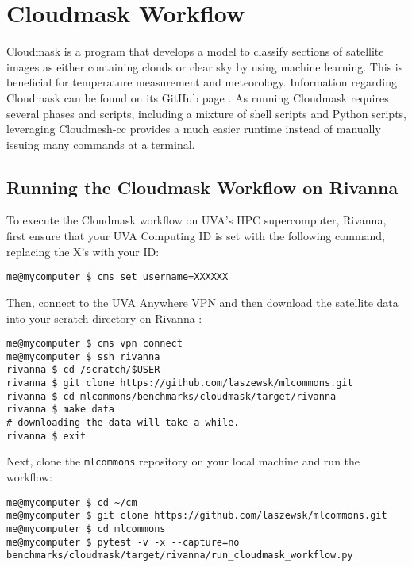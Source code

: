 
\section{Cloudmask Workflow}\label{cloudmask-workflow}

Cloudmask is a program that develops a model to classify sections
of satellite images as either containing clouds or clear sky by
using machine learning. This is beneficial for temperature measurement and
meteorology.
Information regarding Cloudmask can be found on its GitHub page \cite{www-cloudmask}.
As running Cloudmask requires several phases and scripts, including a
mixture of shell scripts and Python scripts, leveraging Cloudmesh-cc
provides a much easier runtime instead of manually issuing many commands at
a terminal.

\subsection{Running the Cloudmask Workflow on
Rivanna}\label{running-the-cloudmask-workflow-on-rivanna}

To execute the Cloudmask workflow on UVA's HPC supercomputer, Rivanna, first
ensure that your UVA Computing ID is set with the following command,
replacing the X's with your ID:

\begin{verbatim}
me@mycomputer $ cms set username=XXXXXX
\end{verbatim}

Then, connect to the UVA Anywhere VPN and then download the satellite
data into your
\href{https://www.rc.virginia.edu/userinfo/storage/non-sensitive-data/\#scratch}{scratch}
directory on Rivanna \cite{www-rivanna}:

\smallskip
\begin{verbatim}
me@mycomputer $ cms vpn connect
me@mycomputer $ ssh rivanna
rivanna $ cd /scratch/$USER
rivanna $ git clone https://github.com/laszewsk/mlcommons.git
rivanna $ cd mlcommons/benchmarks/cloudmask/target/rivanna
rivanna $ make data
# downloading the data will take a while.
rivanna $ exit
\end{verbatim}
\smallskip

Next, clone the {\scriptsize \verb|mlcommons|} repository on your local machine and
run the workflow:

\smallskip
\begin{verbatim}
me@mycomputer $ cd ~/cm
me@mycomputer $ git clone https://github.com/laszewsk/mlcommons.git
me@mycomputer $ cd mlcommons
me@mycomputer $ pytest -v -x --capture=no benchmarks/cloudmask/target/rivanna/run_cloudmask_workflow.py
\end{verbatim}
\smallskip


